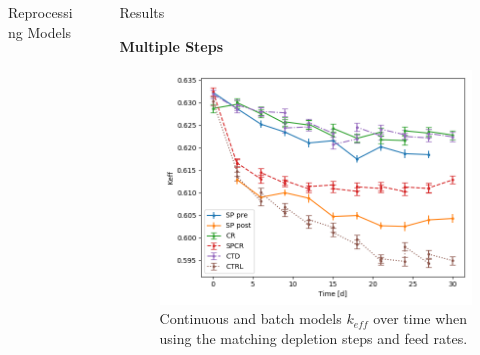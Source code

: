 \documentclass[final]{beamer}
\newlength{\sepwid}
\newlength{\onecolwid}
\newlength{\threecolwid}
\begin{document}
\begin{frame}[t]
\begin{columns}[t,totalwidth=\threecolwid]
\begin{column}{\onecolwid}
\begin{block}{Reprocessing Models}
\end{block}


\end{column} %

\begin{column}{\sepwid}\end{column} %

\begin{column}{\onecolwid} %

\begin{block}{Results}
%
%
\vspace{0.7em}



\textbf{Multiple Steps}
\begin{figure}
	\label{fig:keff_30d_batch}
	\includegraphics[width=0.9\linewidth]{images/cumulative_keff_batch.png}
	\caption{Continuous and batch models $k_{eff}$ over time when using the matching depletion steps and feed rates.}
\end{figure}


\end{block}
\end{column}
\end{columns}
\end{frame}
\end{document}
